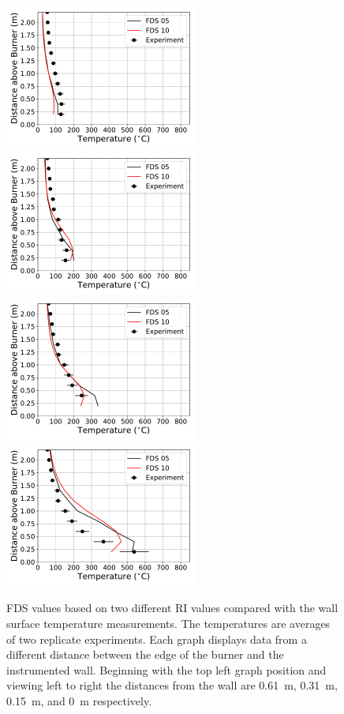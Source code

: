 \documentclass[twoside]{uocthesis}
\begin{document}
{\begin{figure}[ht!]
  \centering
  \includegraphics[width=2.5in]{../Figures/IWGB_NG_TC_Surface_Center_Avg_2D_RF_RI}
  \includegraphics[width=2.5in]{../Figures/IWGB_NG_TC_Surface_Center_Avg_1D_RF_RI}\\
  \includegraphics[width=2.5in]{../Figures/IWGB_NG_TC_Surface_Center_Avg_0p5D_RF_RI}
  \includegraphics[width=2.5in]{../Figures/IWGB_NG_TC_Surface_Center_Avg_0D_RF_RI}\\
  \caption[FDS values based on two different RI values compared with the wall surface temperature measurements.]{FDS values based on two different RI values compared with the wall surface temperature measurements. The temperatures are averages of two replicate experiments. Each graph displays data from a different distance between the edge of the burner and the instrumented wall.  Beginning with the top left graph position and viewing left to right the distances from the wall are 0.61~m, 0.31~m, 0.15~m, and 0~m respectively.}
  \label{FDS_Wall_Temp_IWGB_comp}
\end{figure}



}
\end{document}
